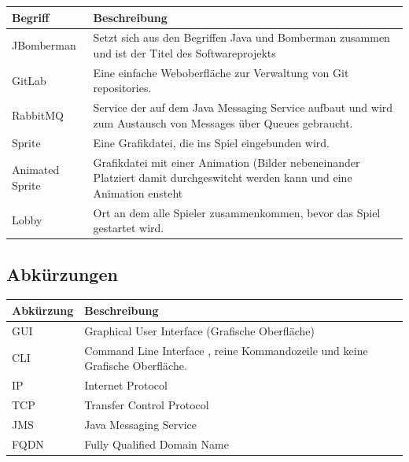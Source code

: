 \documentclass[11pt]{scrartcl}
\begin{document}
\begin{tabularx}{\linewidth}{l | X}
    \textbf{Begriff} & \textbf{Beschreibung}\\
    \hline
    JBomberman & Setzt sich aus den Begriffen Java und Bomberman zusammen und ist der Titel des Softwareprojekts\\
    \hline
    GitLab & Eine einfache Weboberfläche zur Verwaltung von Git repositories.\\
    \hline
    RabbitMQ & Service der auf dem Java Messaging Service aufbaut und wird zum Austausch von Messages über Queues gebraucht.\\
    \hline
    Sprite & Eine Grafikdatei, die ins Spiel eingebunden wird.\\
    \hline
    Animated Sprite & Grafikdatei mit einer Animation (Bilder nebeneinander Platziert damit durchgeswitcht werden kann und eine Animation ensteht\\
    \hline
    Lobby & Ort an dem alle Spieler zusammenkommen, 
    bevor das Spiel gestartet wird.\\
    
\end{tabularx}

\subsection{Abkürzungen}
\begin{tabularx}{\linewidth}{l | X}
    \textbf{Abkürzung} & \textbf{Beschreibung}\\
    \hline
    GUI & Graphical User Interface (Grafische Oberfläche)\\
    \hline
    CLI & Command Line Interface  , reine Kommandozeile 
    und keine Grafische Oberfläche.\\
    \hline 
    IP & Internet Protocol\\
    \hline
    TCP & Transfer Control Protocol\\
    \hline
    JMS & Java Messaging Service\\
    \hline
    FQDN & Fully Qualified Domain Name\\

\end{tabularx}
\end{document}
